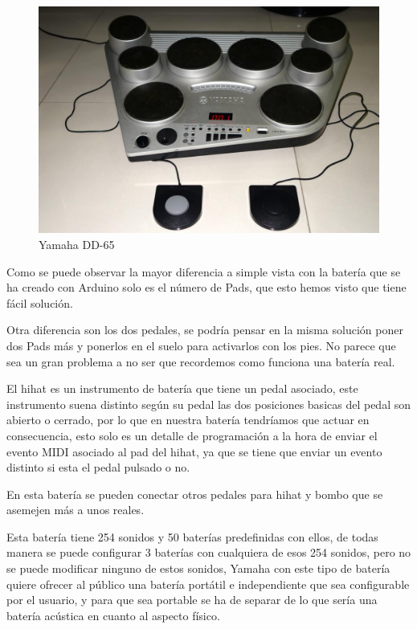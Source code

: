 \documentclass[a4paper,11pt,oneside]{book}
\begin{document}
\begin{figure}[H]
\begin{center}
\includegraphics[scale=0.3]{Imagenes/dd-65.jpg}
\caption{Yamaha DD-65}
\label{Yamaha DD-65}
\end{center}
\end{figure}

Como se puede observar la mayor diferencia a simple vista con la batería que se ha creado con Arduino solo es el número de \gls{Pads}, que esto hemos visto que tiene fácil solución.

Otra diferencia son los dos pedales, se podría pensar en la misma solución poner dos \gls{Pads} más y ponerlos en el suelo para activarlos con los pies. No parece que sea un gran problema a no ser que recordemos como funciona una batería real.

El hihat es un instrumento de batería que tiene un pedal asociado, este instrumento suena distinto según su pedal las dos posiciones basicas del pedal son abierto o cerrado, por lo que en nuestra batería tendríamos que actuar en consecuencia, esto solo es un detalle de programación a la hora de enviar el evento MIDI asociado al pad del hihat, ya que se tiene que enviar un evento distinto si esta el pedal pulsado o no.

En esta batería se pueden conectar otros pedales para hihat y bombo que se asemejen más a unos reales.

Esta batería tiene 254 sonidos y 50 baterías predefinidas con ellos, de todas manera se puede configurar 3 baterías con cualquiera de esos 254 sonidos, pero no se puede modificar ninguno de estos sonidos, Yamaha con este tipo de batería quiere ofrecer al público una batería portátil e independiente que sea configurable por el usuario, y para que sea portable se ha de separar de lo que sería una batería acústica en cuanto al aspecto físico.
\end{document}
